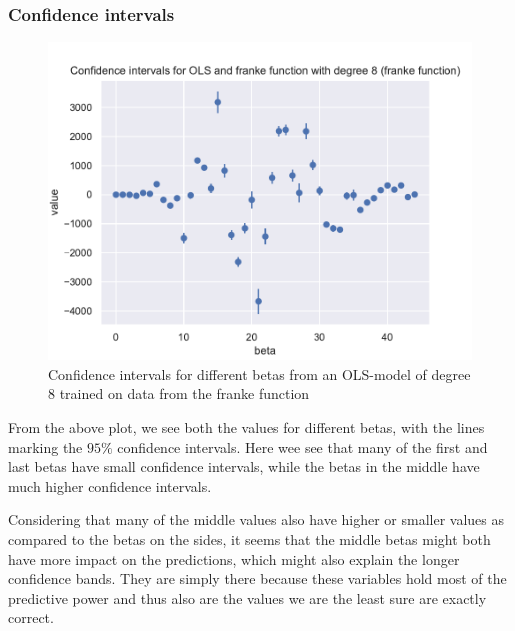 \documentclass[12pt]{article}
\begin{document}


\subsubsection{Confidence intervals}

\begin{figure}[H]
    \centering
    \includegraphics[width=0.8\columnwidth]{../src/output/ols_confidence_intervals_franke_function.pdf}
    \caption{Confidence intervals for different betas from an OLS-model of degree 8 trained on data from the franke function}
    \label{fig:ols_confidence_intervals_franke}
\end{figure}

From the above plot, we see both the values for different betas, with the lines marking the $95\%$ confidence intervals.
Here wee see that many of the first and last betas have small confidence intervals, while the betas in the middle have much higher confidence intervals.

Considering that many of the middle values also have higher or smaller values as compared to the betas on the sides, it seems that the middle betas might both have more impact on the predictions, which might also explain the longer confidence bands.
They are simply there because these variables hold most of the predictive power and thus also are the values we are the least sure are exactly correct.
\end{document}
